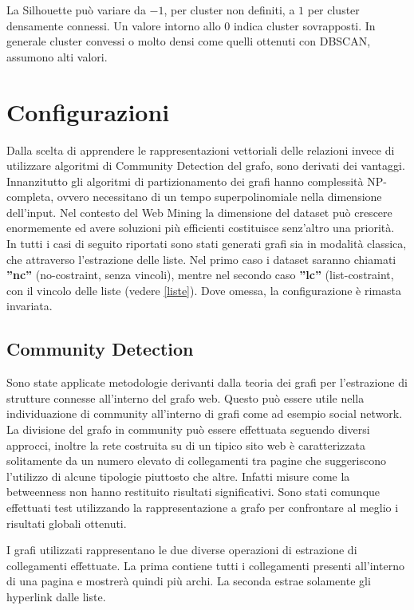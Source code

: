La Silhouette può variare da $-1$, per cluster non definiti, a $1$ per cluster densamente connessi. Un valore intorno allo $0$ indica cluster sovrapposti. In generale cluster convessi o molto densi come quelli ottenuti con DBSCAN, assumono alti valori.


\section{Configurazioni}
Dalla scelta di apprendere le rappresentazioni vettoriali delle relazioni invece di utilizzare algoritmi di Community Detection del grafo, sono derivati dei vantaggi. Innanzitutto gli algoritmi di partizionamento dei grafi hanno complessità NP-completa, ovvero necessitano di un tempo superpolinomiale nella dimensione dell'input. Nel contesto del Web Mining la dimensione del dataset può crescere enormemente ed avere soluzioni più efficienti costituisce senz'altro una priorità. 
\\
In tutti i casi di seguito riportati sono stati generati grafi sia in modalità classica, che attraverso l'estrazione delle liste. Nel primo caso i dataset saranno chiamati \textbf{''nc''} (no-costraint, senza vincoli), mentre nel secondo caso \textbf{''lc''} (list-costraint, con il vincolo delle liste (vedere \ref{liste}). Dove omessa, la configurazione è rimasta invariata.

\subsection{Community Detection}
Sono state applicate metodologie derivanti dalla teoria dei grafi per l'estrazione di strutture connesse all'interno del grafo web. Questo può essere utile nella individuazione di community all'interno di grafi come ad esempio social network. La divisione del grafo in community può essere effettuata seguendo diversi approcci, inoltre la rete costruita su di un tipico sito web è caratterizzata solitamente da un numero elevato di collegamenti tra pagine che suggeriscono l'utilizzo di alcune tipologie piuttosto che altre. Infatti misure come la betweenness non hanno restituito risultati significativi.
Sono stati comunque effettuati test utilizzando la rappresentazione a grafo per confrontare al meglio i risultati globali ottenuti.


I grafi utilizzati rappresentano le due diverse operazioni di estrazione di collegamenti effettuate. La prima contiene tutti i collegamenti presenti all'interno di una pagina e mostrerà quindi più archi. La seconda estrae solamente gli hyperlink dalle liste.

